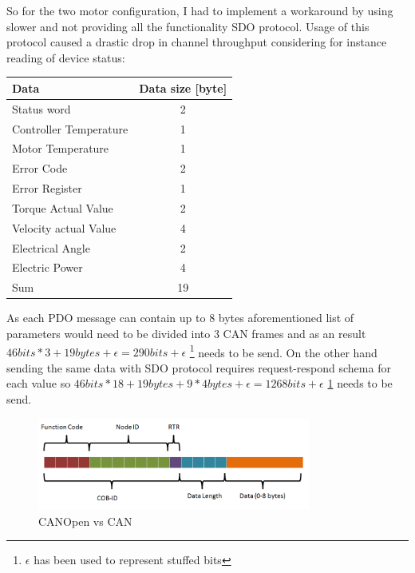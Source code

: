 So for the two motor configuration, I had to implement a workaround by using slower and not providing all the functionality SDO protocol.
Usage of this protocol caused a drastic drop in channel throughput considering for instance reading of device status:
\begin{table}[H]
\begin{tabular}{|l|c|}
    \hline
    Data & Data size [byte] \\
    \hline
    Status word & 2 \\
    Controller Temperature & 1 \\
    Motor Temperature & 1 \\
    Error Code & 2  \\
    Error Register & 1 \\
    Torque Actual Value & 2  \\
    Velocity actual Value & 4  \\
    Electrical Angle & 2  \\
    Electric Power & 4 \\
    \hline
    \hfill Sum & 19 \\
    \hline
\end{tabular}
\end{table}

As each PDO message can contain up to 8 bytes aforementioned list of parameters would need to be divided into 3 CAN frames and as an result $46bits*3+19bytes+\epsilon = 290 bits +\epsilon$  \hspace{1cm}\footnote{\label{foot:eps}$\epsilon$ has been used to represent stuffed bits} needs to be send. On the other hand sending the same data with SDO protocol requires request-respond schema for each value so $46bits*18 + 19bytes + 9*4bytes + \epsilon = 1268 bits + \epsilon$ \hspace{1cm} \ref{foot:eps} needs to be send.

\begin{figure}[h]
    \centering
    \includegraphics[width=0.8\textwidth]{figures/CANOpen vs CAN.png}
    \caption{CANOpen vs CAN}
    \label{fig:canopen_bitwise}
\end{figure}

